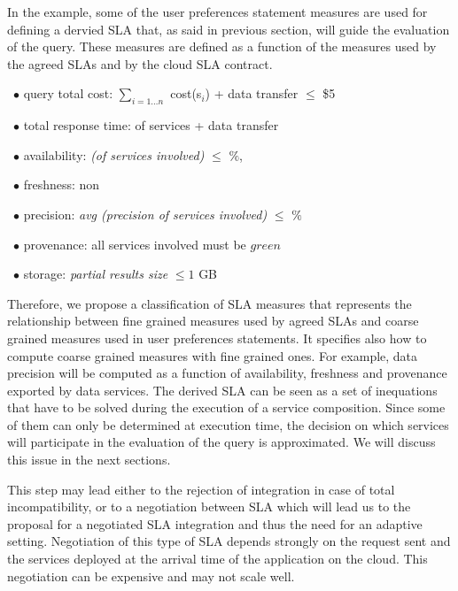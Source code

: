 In the example, some of the user preferences statement measures are used for defining a dervied SLA that, as said in previous section, will guide the evaluation of the query. These measures are defined as a function of the measures used by the agreed SLAs and by the cloud SLA contract.
\begin{trivlist}\sf\footnotesize
\item[~$\bullet$ ] query total cost: $\sum_{i = 1\dots n}$ cost(s$_i$) + data transfer $\leq$ \$5
 \item[~$\bullet$ ] total response time: of services + data transfer
 \item[~$\bullet$ ] availability: {\em (of services involved)} $\leq$ {$\%$}, 
 \item[~$\bullet$ ] freshness: non 
 \item[~$\bullet$ ] precision: {\em avg (precision of services involved)} $\leq$ {$\%$}
 \item[~$\bullet$ ] provenance:  all services involved must be $green$
 \item[~$\bullet$ ] storage: {\em partial results size} $\leq 1$ GB
 \end{trivlist} 
 
Therefore, we propose a classification of SLA measures that represents the relationship between fine grained measures used by agreed SLAs and coarse grained measures used in user preferences statements. It specifies also how to compute coarse grained measures with fine grained ones. For example, data precision will be computed as a function of availability, freshness and provenance exported by data services. The derived SLA  can be seen as a set of inequations that have to be solved during the execution of a service composition. Since some of them can only be determined at execution time, the decision on which services will participate in the evaluation of the query is approximated. We will discuss this issue in the next sections.


This step may lead either to the rejection of integration in case of total incompatibility, or to a negotiation between SLA which will lead us to the proposal for a negotiated SLA integration and thus the need for an adaptive setting.
%
%
%
 Negotiation of this type of SLA depends strongly on the request sent and the services deployed at the arrival time of the application on the cloud. This negotiation can be expensive and may not scale well.


